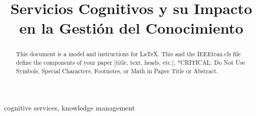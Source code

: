 \documentclass[conference]{IEEEtran}
\begin{document}
\title{Servicios Cognitivos y su Impacto en la Gestión del Conocimiento}

\author{
\and
{}
\and
{}
\and
{}
}

\maketitle

\begin{abstract}
This document is a model and instructions for \LaTeX.
This and the IEEEtran.cls file define the components of your paper [title, text, heads, etc.]. *CRITICAL: Do Not Use Symbols, Special Characters, Footnotes, 
or Math in Paper Title or Abstract.
\end{abstract}

\begin{IEEEkeywords}
cognitive services, knowledge management
\end{IEEEkeywords}







\end{document}
